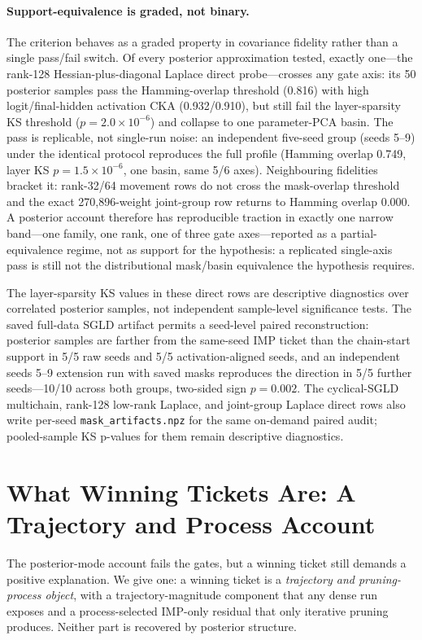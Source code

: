 \documentclass{article}
\begin{document}
\paragraph{Support-equivalence is graded, not binary.}
The criterion behaves as a graded property in covariance fidelity rather than a
single pass/fail switch. Of every posterior approximation tested, exactly
one---the rank-128 Hessian-plus-diagonal Laplace direct probe---crosses any
gate axis: its 50 posterior samples pass the Hamming-overlap threshold (0.816)
with high logit/final-hidden activation CKA (0.932/0.910), but still fail the
layer-sparsity KS threshold ($p=2.0{\times}10^{-6}$) and collapse to one
parameter-PCA basin. The pass is replicable, not single-run noise: an
independent five-seed group (seeds 5--9) under the identical protocol
reproduces the full profile (Hamming overlap 0.749, layer KS
$p=1.5{\times}10^{-6}$, one basin, same 5/6 axes). Neighbouring fidelities
bracket it: rank-32/64 movement rows do not cross the mask-overlap
threshold and the exact 270,896-weight joint-group row returns to Hamming
overlap 0.000. A posterior account therefore has reproducible traction in
exactly one narrow band---one family, one rank, one of three gate
axes---reported as a partial-equivalence regime, not as support for the
hypothesis: a replicated single-axis pass is still not the distributional
mask/basin equivalence the hypothesis requires.

The layer-sparsity KS values in these direct rows are descriptive diagnostics
over correlated posterior samples, not independent sample-level significance
tests. The saved full-data SGLD artifact permits a seed-level paired
reconstruction: posterior samples are farther from the same-seed IMP ticket
than the chain-start support in 5/5 raw seeds and 5/5 activation-aligned
seeds, and an independent seeds 5--9 extension run with saved masks
reproduces the direction in 5/5 further seeds---10/10 across both groups,
two-sided sign $p = 0.002$. The cyclical-SGLD multichain, rank-128
low-rank Laplace, and joint-group Laplace direct rows also write per-seed
\texttt{mask\_artifacts.npz} for the same on-demand paired audit;
pooled-sample KS p-values for them remain descriptive diagnostics.

\section{What Winning Tickets Are: A Trajectory and Process Account}
\label{sec:trajectory-process}

The posterior-mode account fails the gates, but a winning ticket still demands
a positive explanation. We give one: a winning ticket is a \emph{trajectory and
pruning-process object}, with a trajectory-magnitude component that any dense
run exposes and a process-selected IMP-only residual that only iterative
pruning produces. Neither part is recovered by posterior structure.
\end{document}
